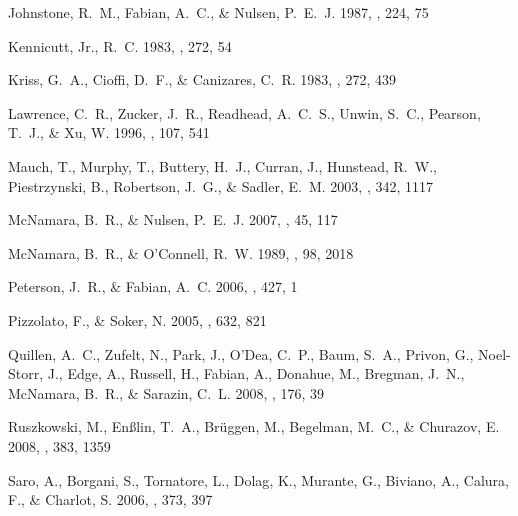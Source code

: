 \documentclass[12pt,preprint]{aastex}
\begin{document}
\begin{thebibliography}{44}
{Johnstone}, R.~M., {Fabian}, A.~C., \& {Nulsen}, P.~E.~J. 1987, \mnras, 224,
  75

{Kennicutt}, Jr., R.~C. 1983, \apj, 272, 54

{Kriss}, G.~A., {Cioffi}, D.~F., \& {Canizares}, C.~R. 1983, \apj, 272, 439

{Lawrence}, C.~R., {Zucker}, J.~R., {Readhead}, A.~C.~S., {Unwin}, S.~C.,
  {Pearson}, T.~J., \& {Xu}, W. 1996, \apjs, 107, 541

{Mauch}, T., {Murphy}, T., {Buttery}, H.~J., {Curran}, J., {Hunstead}, R.~W.,
  {Piestrzynski}, B., {Robertson}, J.~G., \& {Sadler}, E.~M. 2003, \mnras, 342,
  1117

{McNamara}, B.~R., \& {Nulsen}, P.~E.~J. 2007, \araa, 45, 117

{McNamara}, B.~R., \& {O'Connell}, R.~W. 1989, \aj, 98, 2018

{Peterson}, J.~R., \& {Fabian}, A.~C. 2006, \physrep, 427, 1

{Pizzolato}, F., \& {Soker}, N. 2005, \apj, 632, 821

{Quillen}, A.~C., {Zufelt}, N., {Park}, J., {O'Dea}, C.~P., {Baum}, S.~A.,
  {Privon}, G., {Noel-Storr}, J., {Edge}, A., {Russell}, H., {Fabian}, A.,
  {Donahue}, M., {Bregman}, J.~N., {McNamara}, B.~R., \& {Sarazin}, C.~L. 2008,
  \apjs, 176, 39

{Ruszkowski}, M., {En{\ss}lin}, T.~A., {Br{\"u}ggen}, M., {Begelman}, M.~C., \&
  {Churazov}, E. 2008, \mnras, 383, 1359

{Saro}, A., {Borgani}, S., {Tornatore}, L., {Dolag}, K., {Murante}, G.,
  {Biviano}, A., {Calura}, F., \& {Charlot}, S. 2006, \mnras, 373, 397


\end{thebibliography}
\end{document}
